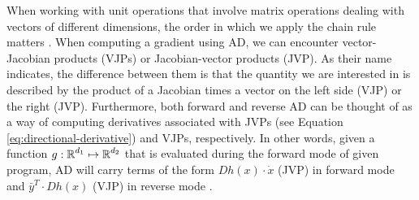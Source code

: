When working with unit operations that involve matrix operations dealing with vectors of different dimensions, the order in which we apply the chain rule matters \cite{Giering_Kaminski_1998}.
When computing a gradient using AD, we can encounter vector-Jacobian products (VJPs) or Jacobian-vector products (JVP).
As their name indicates, the difference between them is that the quantity we are interested in is described by the product of a Jacobian times a vector on the left side (VJP) or the right (JVP).
Furthermore, both forward and reverse AD can be thought of as a way of computing derivatives associated with JVPs (see Equation \eqref{eq:directional-derivative}) and VJPs, respectively. 
In other words, given a function $g: \operatorname{\mathbb{R}}^{d_1} \mapsto \operatorname{\mathbb{R}}^{d_2}$ that is evaluated during the forward mode of given program, AD will carry terms of the form $Dh (x) \cdot \dot x$ (JVP) in forward mode and $\bar y^T \cdot Dh (x)$ (VJP) in reverse mode \cite{Griewank:2008kh}.

